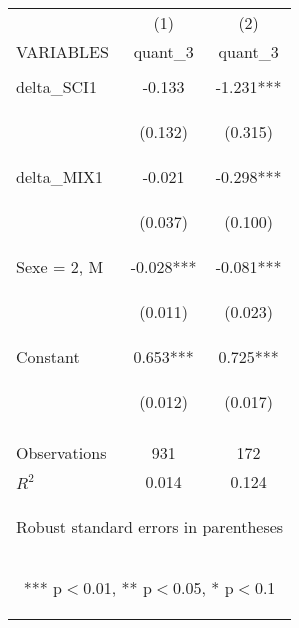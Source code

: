 \begin{center}
\begin{tabular}{lcc} \hline
 & (1) & (2) \\
VARIABLES & quant\_3 & quant\_3 \\ \hline
\vspace{4pt} & \begin{footnotesize}\end{footnotesize} & \begin{footnotesize}\end{footnotesize} \\
delta\_SCI1 & -0.133 & -1.231*** \\
\vspace{4pt} & \begin{footnotesize}(0.132)\end{footnotesize} & \begin{footnotesize}(0.315)\end{footnotesize} \\
delta\_MIX1 & -0.021 & -0.298*** \\
\vspace{4pt} & \begin{footnotesize}(0.037)\end{footnotesize} & \begin{footnotesize}(0.100)\end{footnotesize} \\
Sexe = 2, M & -0.028*** & -0.081*** \\
\vspace{4pt} & \begin{footnotesize}(0.011)\end{footnotesize} & \begin{footnotesize}(0.023)\end{footnotesize} \\
Constant & 0.653*** & 0.725*** \\
 & \begin{footnotesize}(0.012)\end{footnotesize} & \begin{footnotesize}(0.017)\end{footnotesize} \\
\vspace{4pt} & \begin{footnotesize}\end{footnotesize} & \begin{footnotesize}\end{footnotesize} \\
Observations & 931 & 172 \\
 $R^2$ & 0.014 & 0.124 \\ \hline
\multicolumn{3}{c}{\begin{footnotesize} Robust standard errors in parentheses\end{footnotesize}} \\
\multicolumn{3}{c}{\begin{footnotesize} *** p$<$0.01, ** p$<$0.05, * p$<$0.1\end{footnotesize}} \\
\end{tabular}
\end{center}
